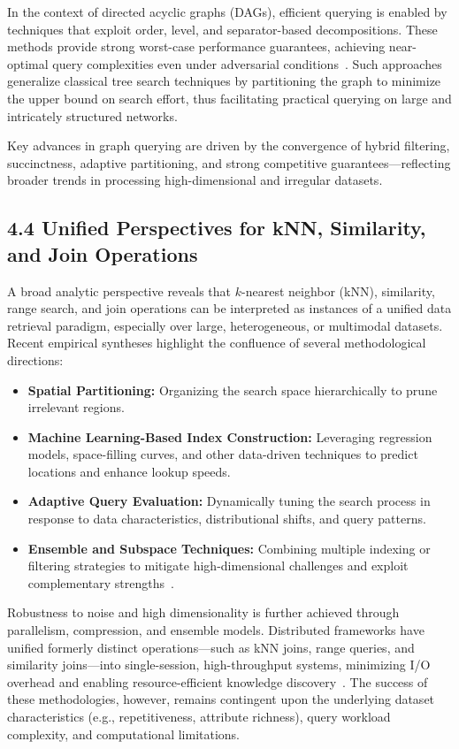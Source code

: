 \documentclass[11pt]{article}
\begin{document}
In the context of directed acyclic graphs (DAGs), efficient querying is enabled by techniques that exploit order, level, and separator-based decompositions. These methods provide strong worst-case performance guarantees, achieving near-optimal query complexities even under adversarial conditions~\cite{ref107}. Such approaches generalize classical tree search techniques by partitioning the graph to minimize the upper bound on search effort, thus facilitating practical querying on large and intricately structured networks.

Key advances in graph querying are driven by the convergence of hybrid filtering, succinctness, adaptive partitioning, and strong competitive guarantees—reflecting broader trends in processing high-dimensional and irregular datasets.

\subsection{4.4 Unified Perspectives for kNN, Similarity, and Join Operations}

A broad analytic perspective reveals that $k$-nearest neighbor (kNN), similarity, range search, and join operations can be interpreted as instances of a unified data retrieval paradigm, especially over large, heterogeneous, or multimodal datasets. Recent empirical syntheses highlight the confluence of several methodological directions:

\begin{itemize}
    \item \textbf{Spatial Partitioning:} Organizing the search space hierarchically to prune irrelevant regions.
    \item \textbf{Machine Learning-Based Index Construction:} Leveraging regression models, space-filling curves, and other data-driven techniques to predict locations and enhance lookup speeds.
    \item \textbf{Adaptive Query Evaluation:} Dynamically tuning the search process in response to data characteristics, distributional shifts, and query patterns.
    \item \textbf{Ensemble and Subspace Techniques:} Combining multiple indexing or filtering strategies to mitigate high-dimensional challenges and exploit complementary strengths~\cite{ref30,ref31,ref34,ref35,ref39,ref45,ref47,ref50,ref51,ref54,ref56,ref73,ref75,ref86,ref91,ref98,ref107,ref111,ref114,ref118}.
\end{itemize}

Robustness to noise and high dimensionality is further achieved through parallelism, compression, and ensemble models. Distributed frameworks have unified formerly distinct operations—such as kNN joins, range queries, and similarity joins—into single-session, high-throughput systems, minimizing I/O overhead and enabling resource-efficient knowledge discovery~\cite{ref116,ref118}. The success of these methodologies, however, remains contingent upon the underlying dataset characteristics (e.g., repetitiveness, attribute richness), query workload complexity, and computational limitations.
\end{document}
